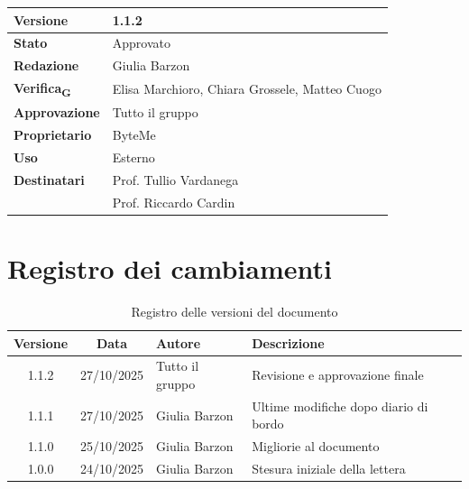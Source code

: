 \documentclass[11pt,a4paper]{article}
\newcommand{\gls}[1]{#1\textsubscript{G}}
\begin{document}
\begin{titlepage}
    \begin{table}[H]
        \centering
        \begin{tabular}{|l|p{5cm}|}
            \hline
            \textbf{Versione} & 1.1.2 \\
            \hline
            \textbf{Stato} & Approvato \\
            \hline
            \textbf{Redazione} & Giulia Barzon \\
            \hline
            \textbf{\gls{Verifica}} & Elisa Marchioro, Chiara Grossele, Matteo Cuogo \\
            \hline
            \textbf{Approvazione} & Tutto il gruppo \\
            \hline
            \textbf{Proprietario} & ByteMe \\
            \hline
            \textbf{Uso} & Esterno \\
            \hline
            \textbf{Destinatari} & Prof. Tullio Vardanega \\ & Prof. Riccardo Cardin \\
            \hline
        \end{tabular}
    \end{table}
    
    \vfill
\end{titlepage}

\section*{Registro dei cambiamenti}

\begin{table}[H]
    \centering
    \begin{tabular}{|c|c|>{\raggedright\arraybackslash}p{}|>{\raggedright\arraybackslash}p{}|}
        \hline
        \textbf{Versione} & \textbf{Data} & \textbf{Autore} & \textbf{Descrizione} \\
        \hline
        1.1.2 & 27/10/2025 & Tutto il gruppo & Revisione e approvazione finale \\
        \hline
        1.1.1 & 27/10/2025 & Giulia Barzon & Ultime modifiche dopo diario di bordo \\
        \hline
        1.1.0 & 25/10/2025 & Giulia Barzon & Migliorie al documento \\
        \hline
        1.0.0 & 24/10/2025 & Giulia Barzon & Stesura iniziale della lettera \\
        \hline
    \end{tabular}
    \caption{Registro delle versioni del documento}
    \label{tab:versionamento}
\end{table}
\end{document}
